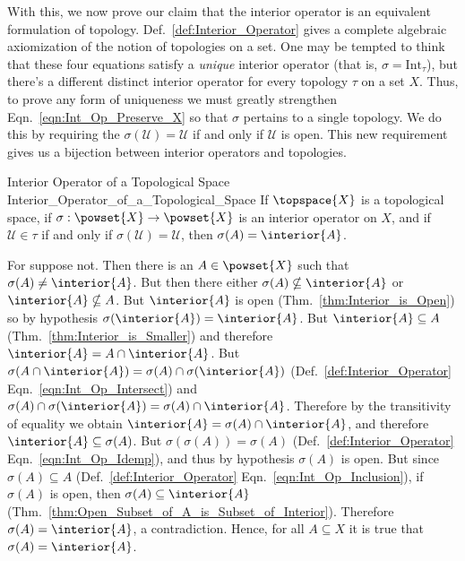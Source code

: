         With this, we now prove our claim that the interior operator is an
        equivalent formulation of topology. Def.~\ref{def:Interior_Operator}
        gives a complete algebraic axiomization of the notion of topologies
        on a set. One may be tempted to think that these four equations
        satisfy a \textit{unique} interior operator
        (that is, $\sigma=\textrm{Int}_{\tau}$), but there's a different
        distinct interior operator for every topology $\tau$ on a set $X$.
        Thus, to prove any form of uniqueness we must greatly strengthen
        Eqn.~\ref{eqn:Int_Op_Preserve_X} so that $\sigma$ pertains to a
        single topology. We do this by requiring the
        $\sigma(\mathcal{U})=\mathcal{U}$ if and only if $\mathcal{U}$ is
        open. This new requirement gives us a bijection between interior
        operators and topologies.
        \begin{ftheorem}{Interior Operator of a Topological Space}
                        {Interior_Operator_of_a_Topological_Space}
            If $\topspace{X}$ is a topological space, if
            $\sigma:\powset{X}\rightarrow\powset{X}$ is an interior operator
            on $X$, and if $\mathcal{U}\in\tau$ if and only if
            $\sigma(\mathcal{U})=\mathcal{U}$, then
            $\sigma(A)=\interior{A}$.
        \end{ftheorem}
        \begin{bproof}
            For suppose not. Then there is an $A\in\powset{X}$ such that
            $\sigma(A)\ne\interior{A}$. But then there either
            $\sigma(A)\nsubseteq\interior{A}$ or
            $\interior{A}\nsubseteq{A}$. But $\interior{A}$ is open
            (Thm.~\ref{thm:Interior_is_Open}) so by hypothesis
            $\sigma(\interior{A})=\interior{A}$. But
            $\interior{A}\subseteq{A}$ (Thm.~\ref{thm:Interior_is_Smaller})
            and therefore $\interior{A}=A\cap\interior{A}$. But
            $\sigma(A\cap\interior{A})=\sigma(A)\cap\sigma(\interior{A})$
            (Def.~\ref{def:Interior_Operator}
            Eqn.~\ref{eqn:Int_Op_Intersect}) and
            $\sigma(A)\cap\sigma(\interior{A})=\sigma(A)\cap\interior{A}$.
            Therefore by the transitivity of equality we obtain
            $\interior{A}=\sigma(A)\cap\interior{A}$, and therefore
            $\interior{A}\subseteq\sigma(A)$. But
            $\sigma(\sigma(A))=\sigma(A)$ (Def.~\ref{def:Interior_Operator}
            Eqn.~\ref{eqn:Int_Op_Idemp}), and thus by hypothesis $\sigma(A)$
            is open. But since $\sigma(A)\subseteq{A}$
            (Def.~\ref{def:Interior_Operator}
            Eqn.~\ref{eqn:Int_Op_Inclusion}), if $\sigma(A)$ is open, then
            $\sigma(A)\subseteq\interior{A}$
            (Thm.~\ref{thm:Open_Subset_of_A_is_Subset_of_Interior}).
            Therefore $\sigma(A)=\interior{A}$, a contradiction. Hence, for
            all $A\subseteq{X}$ it is true that $\sigma(A)=\interior{A}$.
        \end{bproof}
